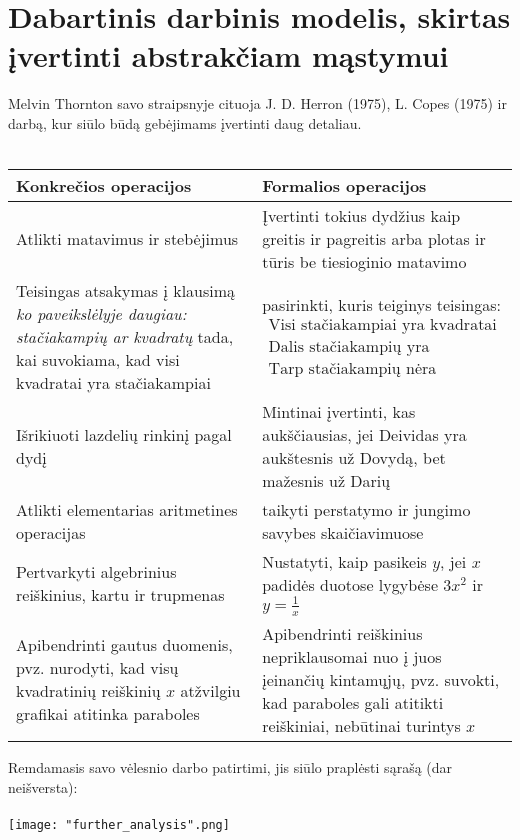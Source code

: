 \documentclass{article}
\begin{document}
\section*{Dabartinis darbinis modelis, skirtas įvertinti abstrakčiam mąstymui}
Melvin Thornton savo straipsnyje cituoja J. D. Herron (1975),  L. Copes (1975) ir darbą, kur siūlo būdą gebėjimams įvertinti daug detaliau.\\
\\
\noindent\begin{tabularx}{\textwidth}{|X|X|}
\hline
Konkrečios operacijos & Formalios operacijos \\ \hline 
Atlikti matavimus ir stebėjimus & Įvertinti tokius dydžius kaip greitis ir pagreitis arba plotas ir tūris be tiesioginio matavimo \\ \hline 
Teisingas atsakymas į klausimą \textit{ko paveikslėlyje daugiau: stačiakampių ar kvadratų}
tada, kai suvokiama, kad visi kvadratai yra stačiakampiai & pasirinkti, kuris teiginys teisingas: \phantom{xxxxxxxxxxxxxxx} $\begin{array}{l}\text{Visi stačiakampiai yra kvadratai} \\ \text{Dalis stačiakampių yra kvadratai} \\ \text{Tarp stačiakampių nėra kvadratų} \end{array}$ \\ \hline 
Išrikiuoti lazdelių rinkinį pagal dydį & Mintinai įvertinti, kas aukščiausias, jei Deividas yra aukštesnis už Dovydą, bet mažesnis už Darių \\ \hline 
Atlikti elementarias aritmetines operacijas & taikyti perstatymo ir jungimo savybes skaičiavimuose \\ \hline 
Pertvarkyti algebrinius reiškinius, kartu ir trupmenas & Nustatyti, kaip pasikeis $y$, jei $x$ padidės duotose lygybėse $3x^2$ ir $y=\frac{1}{x}$ \\ \hline 
Apibendrinti gautus duomenis, pvz. nurodyti, kad visų kvadratinių reiškinių $x$ atžvilgiu grafikai atitinka paraboles & Apibendrinti reiškinius nepriklausomai nuo į juos įeinančių kintamųjų, pvz. suvokti, kad paraboles gali atitikti reiškiniai, nebūtinai turintys $x$\\ \hline
\end{tabularx}

Remdamasis savo vėlesnio darbo patirtimi, jis siūlo praplėsti sąrašą (dar neišversta):\\
\\
\noindent\texttt{[image: "further\_analysis".png]}
\end{document}
